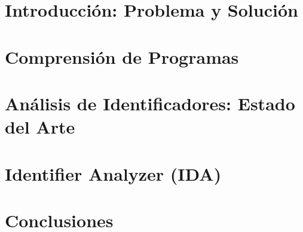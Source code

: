 \documentclass[a4paper,12pt]{report}
\begin{document}


\tableofcontents %

\chapter{Introducción: Problema y Solución}


\chapter{Comprensión de Programas}


\chapter{Análisis de Identificadores: Estado del Arte}


\chapter{Identifier Analyzer (IDA)}


\chapter{Conclusiones}




\end{document}
